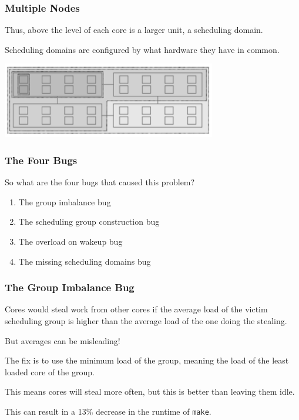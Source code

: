 \begin{frame}
\frametitle{Multiple Nodes}

Thus, above the level of each core is a larger unit, a scheduling domain. 

Scheduling domains are configured by what hardware they have in common.

\begin{center}
	\includegraphics[width=0.7\textwidth]{images/wastedcores.png}\\
\end{center}

\end{frame}



\begin{frame}
\frametitle{The Four Bugs}

So what are the four bugs that caused this problem?
\begin{enumerate}
	\item The group imbalance bug
	\item The scheduling group construction bug
	\item The overload on wakeup bug
	\item The missing scheduling domains bug
\end{enumerate}

\end{frame}



\begin{frame}
\frametitle{The Group Imbalance Bug}

Cores would steal work from other cores if the average load of the victim scheduling group is higher than the average load of the one doing the stealing. 

But averages can be misleading! 

The fix is to use the minimum load of the group, meaning the load of the least loaded core of the group. 

This means cores will steal more often, but this is better than leaving them idle. 

This can result in a 13\% decrease in the runtime of \texttt{make}.

\end{frame}



